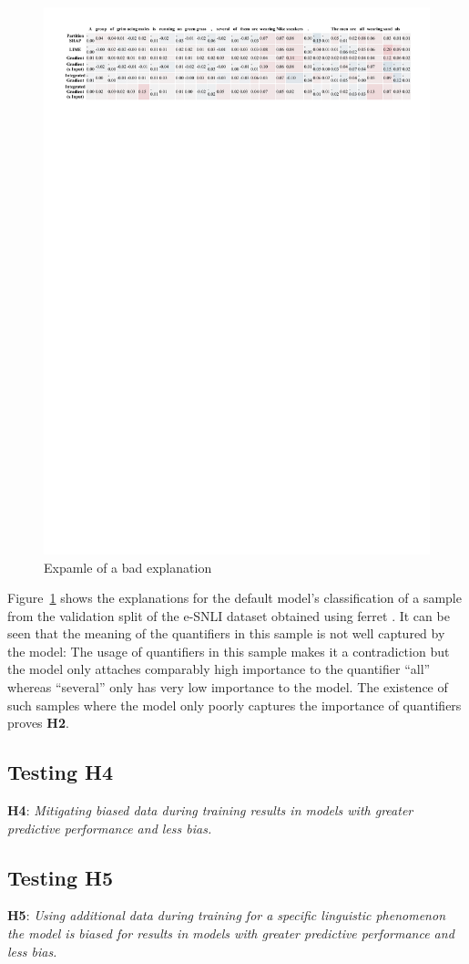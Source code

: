 \begin{figure}[h!]
    \centering
    \includegraphics[width=\textwidth]{./images/ferret_sample.pdf}
    \caption{Expamle of a bad explanation}
    \label{fig:ferret-sample}
\end{figure}

Figure~\ref{fig:ferret-sample} shows the explanations for the default model's classification of a sample from the validation split of the \ac{e-SNLI} dataset obtained using ferret \cite{ferret}. It can be seen that the meaning of the quantifiers in this sample is not well captured by the model: The usage of quantifiers in this sample makes it a contradiction but the model only attaches comparably high importance to the quantifier \enquote{all} whereas \enquote{several} only has very low importance to the model. The existence of such samples where the model only poorly captures the importance of quantifiers proves \textbf{H2}.

\subsection{Testing H4}
\textbf{H4}: \textit{Mitigating biased data during training results in models with greater predictive performance and less bias.}

\subsection{Testing H5}
\textbf{H5}: \textit{Using additional data during training for a specific linguistic phenomenon the model is biased for results in models with greater predictive performance and less bias.}
